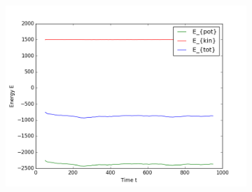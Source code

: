 \begin{figure}[ht]
\begin{subfigure}{0.3\textwidth}
\includegraphics[width=\textwidth]{fig/avEnergies_T1d0_M100.png}
\end{subfigure}
\end{figure}

